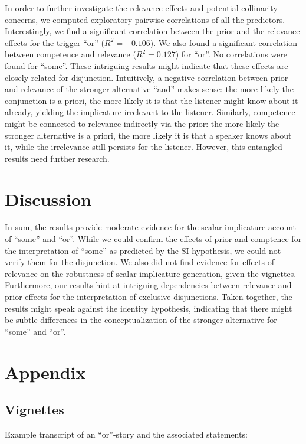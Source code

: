 \documentclass{sp}
\begin{document}
In order to further investigate the relevance effects and potential collinarity concerns, we computed exploratory pairwise correlations of all the predictors. Interestingly, we find a significant correlation between the prior and the relevance effects for the trigger ``or'' ($R^2 = -0.106$). We also found a significant correlation between competence and relevance ($R^2 = 0.127$) for ``or''. No correlations were found for ``some''. These intriguing results might indicate that these effects are closely related for disjunction. Intuitively, a negative correlation between prior and relevance of the stronger alternative ``and'' makes sense: the more likely the conjunction is a priori, the more likely it is that the listener might know about it already, yielding the implicature irrelevant to the listener. Similarly, competence might be connected to relevance indirectly via the prior: the more likely the stronger alternative is a priori, the more likely it is that a speaker knows about it, while the irrelevance still persists for the listener. However, this entangled results need further research.
 
\section{Discussion}
In sum, the results provide moderate evidence for the scalar implicature account of ``some'' and ``or''. While we could confirm the effects of prior and comptence for the interpretation of ``some'' as predicted by the SI hypothesis, we could not verify them for the disjunction. We also did not find evidence for effects of relevance on the robustness of scalar implicature generation, given the vignettes. Furthermore, our results hint at intriguing dependencies between relevance and prior effects for the interpretation of exclusive disjunctions. Taken together, the results might speak against the identity hypothesis, indicating that there might be subtle differences in the conceptualization of the stronger alternative for ``some'' and ``or''.

\section{Appendix}
\subsection{Vignettes}
Example transcript of an “or”-story and the associated statements:
\end{document}
